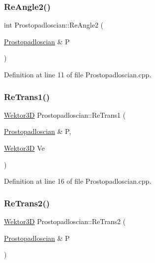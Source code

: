 \subsubsection{\texorpdfstring{Re\+Angle2()}{ReAngle2()}}
{\footnotesize\ttfamily int Prostopadloscian\+::\+Re\+Angle2 (\begin{DoxyParamCaption}\item[{\hyperlink{class_prostopadloscian}{Prostopadloscian} \&}]{P }\end{DoxyParamCaption})}



Definition at line 11 of file Prostopadloscian.\+cpp.

\mbox{\label{class_prostopadloscian_ae7f0619842a6b21eeb7873c85f20cdf9}} 
\subsubsection{\texorpdfstring{Re\+Trans1()}{ReTrans1()}}
{\footnotesize\ttfamily \hyperlink{_wektor3_d_8hh_ac353a272b38b4ad342f7181ad7bdb91a}{Wektor3D} Prostopadloscian\+::\+Re\+Trans1 (\begin{DoxyParamCaption}\item[{\hyperlink{class_prostopadloscian}{Prostopadloscian} \&}]{P,  }\item[{\hyperlink{_wektor3_d_8hh_ac353a272b38b4ad342f7181ad7bdb91a}{Wektor3D}}]{Ve }\end{DoxyParamCaption})}



Definition at line 16 of file Prostopadloscian.\+cpp.

\mbox{\label{class_prostopadloscian_af6d4709d4c10a07a96147450ab3d29e8}} 
\subsubsection{\texorpdfstring{Re\+Trans2()}{ReTrans2()}}
{\footnotesize\ttfamily \hyperlink{_wektor3_d_8hh_ac353a272b38b4ad342f7181ad7bdb91a}{Wektor3D} Prostopadloscian\+::\+Re\+Trans2 (\begin{DoxyParamCaption}\item[{\hyperlink{class_prostopadloscian}{Prostopadloscian} \&}]{P }\end{DoxyParamCaption})}



